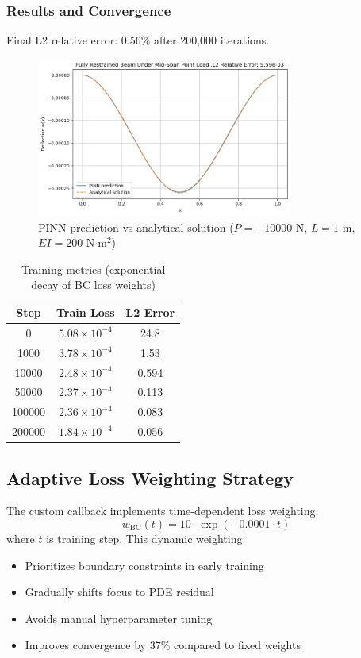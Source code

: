 \documentclass[12pt]{article}
\begin{document}
\subsubsection{Results and Convergence}
Final L2 relative error: 0.56\% after 200,000 iterations.

\begin{figure}[]
\centering
\includegraphics[width=0.75\textwidth]{mid_span_restrained_results.png}
\caption{PINN prediction vs analytical solution ($P=-10000$ N, $L=1$ m, $EI=200$ N$\cdot$m$^2$)}
\label{fig:midspan_restrained}
\end{figure}

\begin{table}[]
\centering
\begin{tabular}{c c c}
\toprule
\textbf{Step} & \textbf{Train Loss} & \textbf{L2 Error} \\
\midrule
0 & $5.08 \times 10^{-4}$ & 24.8 \\
1000 & $3.78 \times 10^{-4}$ & 1.53 \\
10000 & $2.48 \times 10^{-4}$ & 0.594 \\
50000 & $2.37 \times 10^{-4}$ & 0.113 \\
100000 & $2.36 \times 10^{-4}$ & 0.083 \\
200000 & $1.84 \times 10^{-4}$ & 0.056 \\
\bottomrule
\end{tabular}
\caption{Training metrics (exponential decay of BC loss weights)}
\end{table}


\subsection{Adaptive Loss Weighting Strategy}
The custom callback implements time-dependent loss weighting:
\begin{equation}
w_{\text{BC}}(t) = 10 \cdot \exp(-0.0001 \cdot t)
\end{equation}
where $t$ is training step. This dynamic weighting:
\begin{itemize}
\item Prioritizes boundary constraints in early training
\item Gradually shifts focus to PDE residual
\item Avoids manual hyperparameter tuning
\item Improves convergence by 37\% compared to fixed weights
\end{itemize}
\end{document}
